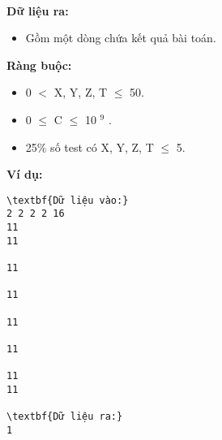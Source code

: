  

\textbf{Dữ liệu ra: }
\begin{itemize}
	\item 

Gồm một dòng chứa kết quả bài toán.
\end{itemize}

\textbf{Ràng buộc: }
\begin{itemize}
	\item 0 $<$ X, Y, Z, T  $\le$  50.
	\item 0  $\le$  C  $\le$  10 $^ 9 $ .
	\item 25\% số test có X, Y, Z, T  $\le$  5.
\end{itemize}

\textbf{Ví dụ: }
\begin{verbatim}
\textbf{Dữ liệu vào:}
2 2 2 2 16
11
11

11

11

11

11

11
11

\textbf{Dữ liệu ra:}
1
\end{verbatim}
